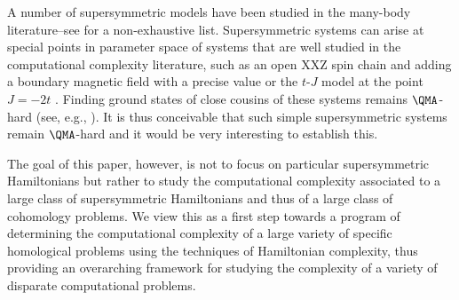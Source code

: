 \documentclass[11pt]{article}
\numberwithin{equation}{section}
\renewcommand\( {\left(}
\renewcommand\) {\right)}
\begin{document}
 A number of supersymmetric models have been studied in the many-body  literature--see \cite{Nicolai:1976xp,1993hep.th...11138S,Fendley_2003,2004JPhA...37.8937Y,Fendley:2006mj,deGier:2015tpa,Fu_2017} for a non-exhaustive list. Supersymmetric systems can arise at special points in parameter space of systems that are well studied in the computational complexity literature, such as an open XXZ spin chain and adding a boundary magnetic field  with a precise value or the $t$-$J$ model at the point $J=-2t$ \cite{2004JPhA...37.8937Y}. Finding ground states of close cousins of these systems remains  $\QMA$-hard (see, e.g.,  \cite{cubitt2016complexity,o2021electronic}).  It is thus conceivable that such simple supersymmetric systems remain $\QMA$-hard and it would be very interesting to establish this.
 
 The goal of this paper, however, is not to focus on particular supersymmetric Hamiltonians but rather to study the computational complexity associated to a large class of  supersymmetric Hamiltonians and thus of a large class of cohomology problems. We view this as a first step towards a program of determining the computational complexity of a large variety of specific homological problems using the techniques of  Hamiltonian complexity, thus providing an overarching framework for studying the complexity of a variety of disparate computational problems. 
 
\end{document}
